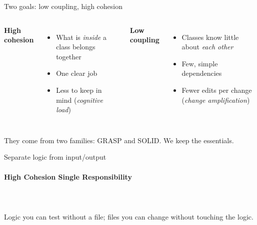 \begin{frame}{Two goals: low coupling, high cohesion}

    \begin{columns}[T]
        \textbf{High cohesion}
        \begin{itemize}
            \item What is \textit{inside} a class belongs together
            \item One clear job
            \item Less to keep in mind (\textit{cognitive load})
        \end{itemize}

        \textbf{Low coupling}
        \begin{itemize}
            \item Classes know little about \textit{each other}
            \item Few, simple dependencies
            \item Fewer edits per change (\textit{change amplification})
        \end{itemize}
    \end{columns}

    \begin{center}
    \small They come from two families: GRASP and SOLID. We keep the essentials.
    \end{center}
\end{frame}




\begin{frame}[fragile]{Separate logic from input/output}
    \framesubtitle{High Cohesion \textperiodcentered{} Single Responsibility}

    \begin{columns}[T]
        \beforelabel
        \inputminted[highlightlines={2,4}]{python}{code/design/io_before.py}

        \pause
        \afterlabel
        \inputminted[highlightlines={5,7}]{python}{code/design/io_after.py}
    \end{columns}

    \vfill

    \begin{center}
    Logic you can test without a file; files you can change without touching the logic.
    \end{center}
\end{frame}




